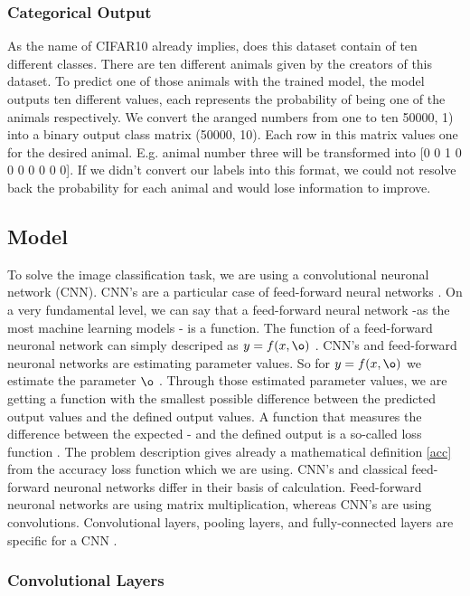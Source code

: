 \documentclass[journal]{IEEEtran}
\begin{document}
\subsubsection{Categorical Output}
As the name of CIFAR10 already implies, does this dataset contain of ten different classes. There are ten different animals given by the creators of this dataset. To predict one of those animals with the trained model, the model outputs ten different values, each represents the probability of being one of the animals respectively. 
We convert the aranged numbers from one to ten 50000, 1) into a binary output class matrix (50000, 10). Each row in this matrix values one for the desired animal. E.g. animal number three will be transformed into [0 0 1 0 0 0 0 0 0 0].
If we didn't convert our labels into this format, we could not resolve back the probability for each animal and would lose information to improve. 

\subsection{Model}
To solve the image classification task, we are using a convolutional neuronal network (CNN). CNN's are a particular case of feed-forward neural networks \cite{Goodfellow-et-al-2016}. On a very fundamental level, we can say that a feed-forward neural network -as the most machine learning models - is a function. The function of a feed-forward neuronal network can simply descriped as \(y = f(x, \o )\) . CNN's and feed-forward neuronal networks are estimating parameter values. So for \(y = f(x, \o )\) we estimate the parameter \(\o \) \cite{Goodfellow-et-al-2016}. Through those estimated parameter values, we are getting a function with the smallest possible difference between the predicted output values and the defined output values. A function that measures the difference between the expected - and the defined output is a so-called loss function \cite{Goodfellow-et-al-2016}. The problem description gives already a mathematical definition \eqref{acc} from the accuracy loss function which we are using. 
CNN's and classical feed-forward neuronal networks differ in their basis of calculation. Feed-forward neuronal networks are using matrix multiplication, whereas CNN's are using convolutions. Convolutional layers, pooling layers, and fully-connected layers are specific for  a CNN \cite{LeCun1998}.
\subsubsection{Convolutional Layers}
\end{document}
